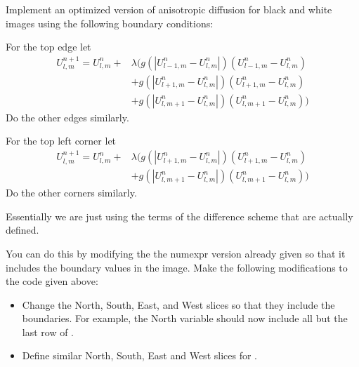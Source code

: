 \begin{problem}
\label{prob:anisdiff_bw}
Implement an optimized version of anisotropic diffusion for black and white images using the following boundary conditions:

For the top edge let
\begin{align*}
U_{l,m}^{n+1} = U_{l,m}^n + & \lambda (g(|U_{l-1,m}^n - U_{l,m}^n|)(U_{l-1,m}^n - U_{l,m}^n) \\
					& + g(|U_{l+1,m}^n - U_{l,m}^n|)(U_{l+1,m}^n - U_{l,m}^n) \\
					& + g(|U_{l,m+1}^n - U_{l,m}^n|)(U_{l,m+1}^n - U_{l,m}^n))
\end{align*}
Do the other edges similarly.

For the top left corner let
\begin{align*}
U_{l,m}^{n+1} = U_{l,m}^n + & \lambda (g(|U_{l+1,m}^n - U_{l,m}^n|)(U_{l+1,m}^n - U_{l,m}^n) \\
					& + g(|U_{l,m+1}^n - U_{l,m}^n|)(U_{l,m+1}^n - U_{l,m}^n))
\end{align*}
Do the other corners similarly.

Essentially we are just using the terms of the difference scheme that are actually defined.

You can do this by modifying the the numexpr version already given so that it includes the boundary values in the image.
Make the following modifications to the code given above:
\begin{itemize}

\item Change the North, South, East, and West slices so that they include the boundaries.
For example, the North variable should now include all but the last row of .

\item Define similar North, South, East and West slices for .


\end{itemize}
\end{problem}
